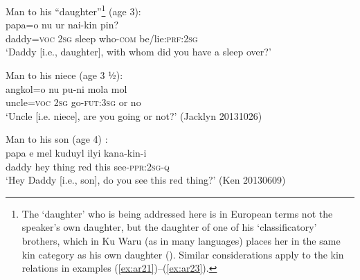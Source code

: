 \documentclass[output=paper]{langsci/langscibook}
\begin{document}
\begin{exe}
	\ex Man to his “daughter”\footnote{The ‘daughter’ who is being addressed here is in European terms not the speaker’s own daughter, but the daughter of one of his ‘classificatory’ brothers, which in Ku Waru (as in many languages) places her in the same kin category as his own daughter (\citealt{Kroeber1909}). Similar considerations apply to the kin relations in examples  (\ref{ex:ar21})--(\ref{ex:ar23}).} (age 3):\label{ex:ar20}\\
	\gll papa=o nu ur nai-kin pin?\\
	daddy=\textsc{voc} 2\textsc{sg}	sleep who-\textsc{com} be/lie:\textsc{prf}:2\textsc{sg}\\
	\trans ‘Daddy [i.e., daughter], with whom did you have a sleep over?’
\end{exe}

\begin{exe}
	\ex Man to his niece (age 3 ½):\label{ex:ar21}\\
	\gll angkol=o nu pu-ni mola mol\\
	uncle=\textsc{voc} 2\textsc{sg} go-\textsc{fut}:3\textsc{sg} or no\\
	\trans ‘Uncle [i.e. niece], are you going or not?’ (Jacklyn 20131026)
\end{exe}

\begin{exe}
	\ex Man to his son	(age 4)	:\label{ex:ar22}\\
	\gll papa e mel kuduyl ilyi kana-kin-i\\
	daddy hey thing red this see-\textsc{ppr}:2\textsc{sg}-\textsc{q}\\
	\trans ‘Hey Daddy [i.e., son], do you see this red thing?’ (Ken 20130609)
\end{exe}
\end{document}
